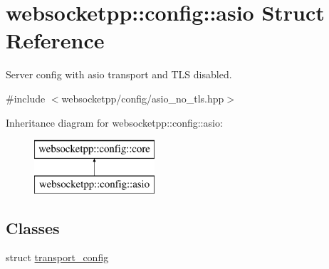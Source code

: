 \hypertarget{structwebsocketpp_1_1config_1_1asio}{}\section{websocketpp\+:\+:config\+:\+:asio Struct Reference}
\label{structwebsocketpp_1_1config_1_1asio}


Server config with asio transport and T\+L\+S disabled.  




{\ttfamily \#include $<$websocketpp/config/asio\+\_\+no\+\_\+tls.\+hpp$>$}

Inheritance diagram for websocketpp\+:\+:config\+:\+:asio\+:\begin{figure}[H]
\begin{center}
\leavevmode
\includegraphics[height=2.000000cm]{structwebsocketpp_1_1config_1_1asio}
\end{center}
\end{figure}
\subsection*{Classes}
\begin{DoxyCompactItemize}
\item 
struct \hyperlink{structwebsocketpp_1_1config_1_1asio_1_1transport__config}{transport\+\_\+config}
\end{DoxyCompactItemize}
